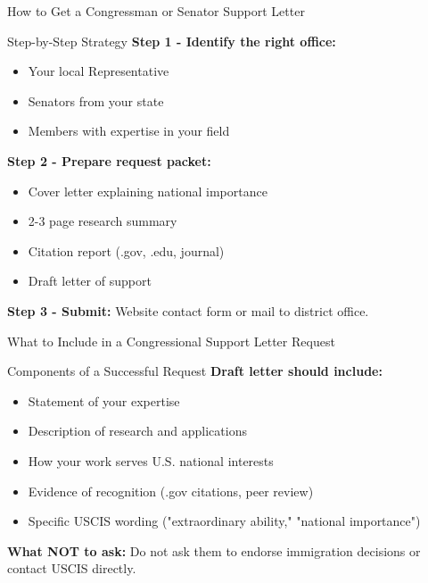 \documentclass[11pt]{beamer}
\begin{document}
	\begin{frame}{How to Get a Congressman or Senator Support Letter}
		\small
		\begin{block}{Step-by-Step Strategy}
			\textbf{Step 1 - Identify the right office:}
			\begin{itemize}
				\item Your local Representative
				\item Senators from your state
				\item Members with expertise in your field
			\end{itemize}
			\textbf{Step 2 - Prepare request packet:}
			\begin{itemize}
				\item Cover letter explaining national importance
				\item 2-3 page research summary
				\item Citation report (.gov, .edu, journal)
				\item Draft letter of support
			\end{itemize}
			\textbf{Step 3 - Submit:} Website contact form or mail to district office.
		\end{block}
	\end{frame}
	
	\begin{frame}{What to Include in a Congressional Support Letter Request}
		\small
		\begin{block}{Components of a Successful Request}
			\textbf{Draft letter should include:}
			\begin{itemize}
				\item Statement of your expertise
				\item Description of research and applications
				\item How your work serves U.S. national interests
				\item Evidence of recognition (.gov citations, peer review)
				\item Specific USCIS wording ("extraordinary ability," "national importance")
			\end{itemize}
			\textbf{What NOT to ask:} Do not ask them to endorse immigration decisions or contact USCIS directly.
		\end{block}
	\end{frame}
	
	
\end{document}
